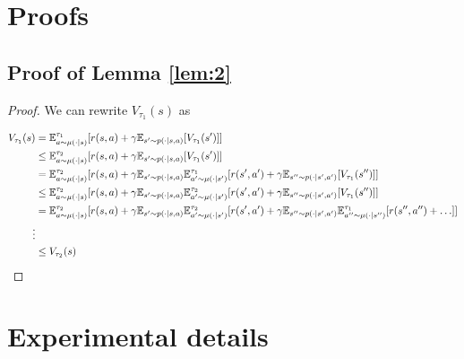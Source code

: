 \documentclass{article} %
\begin{document}




\newpage
\appendix

\section{Proofs}

\label{app:proofs}
\subsection{Proof of Lemma \ref{lem:2}}
\begin{proof}
We can rewrite $V_{\tau_1}(s)$ as 

\begin{align*}
    V_{\tau_1}(s) &= \mathbb{E}^{\tau_1}_{a\sim\mu(\cdot|s)}[r(s,a)+\gamma\mathbb{E}_{s'\sim p(\cdot|s,a)}[V_{\tau_1}(s')]] \\
    & \le \mathbb{E}^{\tau_2}_{a\sim\mu(\cdot|s)}[r(s,a)+\gamma\mathbb{E}_{s'\sim p(\cdot|s,a)}[V_{\tau_1}(s')]] \\
    & = \mathbb{E}^{\tau_2}_{a\sim\mu(\cdot|s)}[r(s,a)+\gamma\mathbb{E}_{s'\sim p(\cdot|s,a)}\mathbb{E}^{\tau_1}_{a'\sim\mu(\cdot|s')}[r(s',a')+\gamma\mathbb{E}_{s''\sim p(\cdot|s',a')}[V_{\tau_1}(s'')]] \\
    & \le \mathbb{E}^{\tau_2}_{a\sim\mu(\cdot|s)}[r(s,a)+\gamma\mathbb{E}_{s'\sim p(\cdot|s,a)}\mathbb{E}^{\tau_2}_{a'\sim\mu(\cdot|s')}[r(s',a')+\gamma\mathbb{E}_{s''\sim p(\cdot|s',a')}[V_{\tau_1}(s'')]] \\
    & = \mathbb{E}^{\tau_2}_{a\sim\mu(\cdot|s)}[r(s,a)+\gamma\mathbb{E}_{s'\sim p(\cdot|s,a)}\mathbb{E}^{\tau_2}_{a'\sim\mu(\cdot|s')}[r(s',a')+\gamma\mathbb{E}_{s''\sim p(\cdot|s',a')}\mathbb{E}^{\tau_1}_{a''\sim\mu(\cdot|s'')}[r(s'', a'')+\ldots]] \\
    \vdots \\
    &\le V_{\tau_2}(s)
\end{align*}
\end{proof}


\section{Experimental details}

\label{app:experiments}
\end{document}

